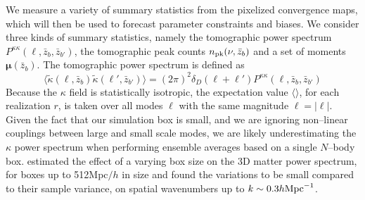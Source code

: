 \documentclass[reprint,aps,prd,superscriptaddress,showkeys,showpacs]{revtex4-1}
\begin{document}
We measure a variety of summary statistics from the pixelized convergence maps, which will then be used to forecast parameter constraints and biases. We consider three kinds of summary statistics, namely the tomographic power spectrum $P^{\kappa\kappa}(\ell,\bar{z}_b,\bar{z}_{b'})$, the tomographic peak counts $n_{\rm pk}(\nu,\bar{z}_b)$ and a set of moments $\pmb{\mu}(\bar{z}_b)$. The tomographic power spectrum is defined as 
\begin{equation}
\langle\tilde{\kappa}(\pmb{\ell},\bar{z}_b)\tilde{\kappa}(\pmb{\ell}',\bar{z}_{b'})\rangle = (2\pi)^2\delta_D(\pmb{\ell}+\pmb{\ell}')P^{\kappa\kappa}(\ell,\bar{z}_b,\bar{z}_{b'})
\end{equation}
%
Because the $\kappa$ field is statistically isotropic, the expectation value $\langle\rangle$, for each realization $r$, is taken over all modes $\pmb{\ell}$ with the same magnitude $\ell=\vert\pmb{\ell}\vert$. Given the fact that our simulation box is small, and we are ignoring non--linear couplings between large and small scale modes, we are likely underestimating the $\kappa$ power spectrum when performing ensemble averages based on a single $N$--body box. \citep{NbodySample} estimated the effect of a varying box size on the 3D matter power spectrum, for boxes up to 512Mpc$/h$ in size and found the variations to be small compared to their sample variance, on spatial wavenumbers up to $k\sim 0.3h{\rm Mpc}^{-1}$. 
\end{document}
